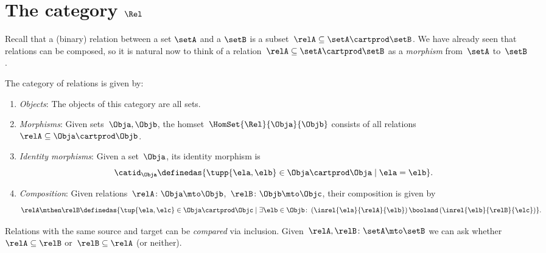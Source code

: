 
\section[The category $\Rel$]{The category $\Rel$}
\label{sec:cat-of-relations}




Recall that a (binary) relation between a set $\setA$ and a $\setB$ is a subset~$\relA \subseteq \setA \cartprod \setB$. 
We have already seen that relations can be composed, so it is natural now to think of a relation~$\relA \subseteq \setA \cartprod \setB$ as a \emph{morphism} from~$\setA$ to~$\setB$.

\begin{ctdefinition}
    \label{def:Rel}
    The category of relations \iindex{\Rel}  is given by:
    \begin{enumerate}
        \item \emph{Objects}: The objects of this category are all sets.
        \item \emph{Morphisms}: Given sets~$\Obja, \Objb$, the homset~$\HomSet{\Rel}{\Obja}{\Objb}$ consists of all relations~$\relA\subseteq \Obja\cartprod \Objb$.
        \item \emph{Identity morphisms}: Given a set~$\Obja$, its identity morphism is
              \begin{equation}
                  \catid_\Obja \definedas \{ \tupp{\ela,\elb} \in \Obja \cartprod \Obja \mid  \ela = \elb \}.
              \end{equation}
        \item \emph{Composition}: Given relations~$\relA \colon \Obja\mto \Objb$,~$\relB \colon \Objb\mto \Objc$, their composition is given by
              \begin{equation}
                  \label{eq:RelCompRule}
                  \relA \mthen \relB \definedas \{\tup{\ela,\elc} \in \Obja \cartprod \Objc \mid  \exists \elb \in \Objb \colon \left(\inrel{\ela}{\relA}{\elb} \right) \booland \left(\inrel{\elb}{\relB}{\elc}\right)\}.
              \end{equation}
    \end{enumerate}
\end{ctdefinition}

\begin{remark}
    Relations with the same source and target can be \emph{compared} via inclusion.
    Given~$\relA, \relB \colon \setA\mto \setB$  we can ask whether~$\relA\subseteq \relB$ or~$\relB\subseteq \relA$ (or neither).
\end{remark}

